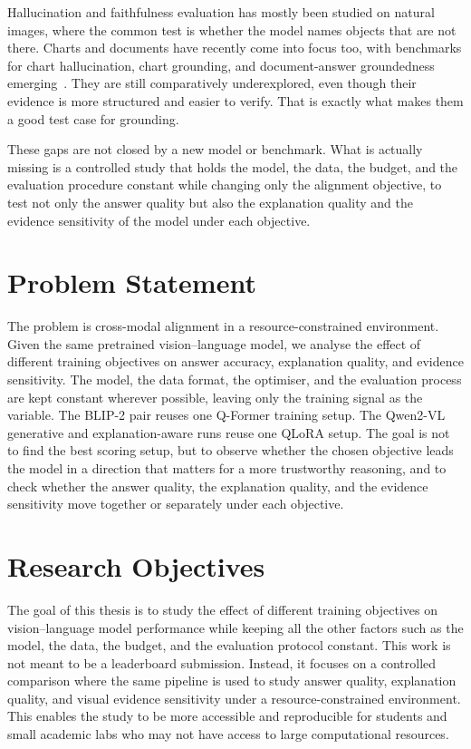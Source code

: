 \documentclass[12pt,bibliography=totoc,listof=totoc,BCOR=5mm,DIV=12,oneside,open=any]{scrbook}
\let\cite\citep
\begin{document}
Hallucination and faithfulness evaluation has mostly been studied on natural images, where the common test is whether the model names objects that are not there.
Charts and documents have recently come into focus too, with benchmarks for chart hallucination, chart grounding, and document-answer groundedness emerging~\cite{wang2025charthal,bansal2025chartab,chen2025docqa}.
They are still comparatively underexplored, even though their evidence is more structured and easier to verify.
That is exactly what makes them a good test case for grounding.

These gaps are not closed by a new model or benchmark. What is actually missing is a controlled study that holds the model, the data, the budget, 
and the evaluation procedure constant while changing only the alignment objective, to test not only the answer quality but also the explanation quality and the evidence sensitivity of the model under each objective.

\section{Problem Statement}
The problem is cross-modal alignment in a resource-constrained environment.
Given the same pretrained vision--language model, we analyse the effect of different training objectives on answer accuracy, explanation quality, and evidence sensitivity.
The model, the data format, the optimiser, and the evaluation process are kept constant wherever possible, leaving only the training signal as the variable.
The BLIP-2 pair reuses one Q-Former training setup. The Qwen2-VL generative and explanation-aware runs reuse one QLoRA setup.
The goal is not to find the best scoring setup, but to observe whether the chosen objective leads the model in a direction that matters for a more trustworthy reasoning,
and to check whether the answer quality, the explanation quality, and the evidence sensitivity move together or separately under each objective.

\section{Research Objectives}
The goal of this thesis is to study the effect of different training objectives on vision--language model performance
while keeping all the other factors such as the model, the data, the budget, and the evaluation protocol constant.
This work is not meant to be a leaderboard submission.
Instead, it focuses on a controlled comparison where the same pipeline is used to 
study answer quality, explanation quality, and visual evidence sensitivity under a resource-constrained environment.
This enables the study to be more accessible and reproducible for students and small academic labs who may not have access to large computational resources.
\end{document}
